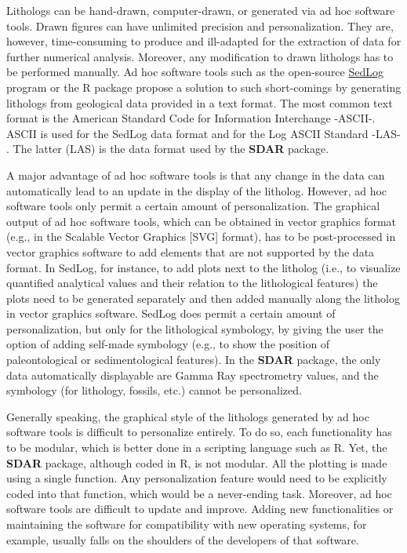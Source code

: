  Lithologs can be hand-drawn, computer-drawn, or generated via ad hoc software tools. Drawn figures can have unlimited precision and personalization. They are, however, time-consuming to produce and ill-adapted for the extraction of data for further numerical analysis. Moreover, any modification to drawn lithologs has to be performed manually. Ad hoc software tools such as the open-source \href{http://www.sedlog.com/}{SedLog} program \citep{zervas_sedlog_2009} or the  R package \citep{ortiz_sdar_2019} propose a solution to such short-comings by generating lithologs from geological data provided in a text format. The most common text format is the American Standard Code for Information Interchange -ASCII-. ASCII is used for the SedLog data format and for the Log ASCII Standard -LAS- \citep{heslop_log_1999}. The latter (LAS) is the data format used by the \textbf{SDAR} package. 
 
 A major advantage of ad hoc software tools is that any change in the data can automatically lead to an update in the display of the litholog. However, ad hoc software tools only permit a certain amount of personalization. The graphical output of ad hoc software tools, which can be obtained in vector graphics format (e.g., in the Scalable Vector Graphics [SVG] format), has to be post-processed in vector graphics software to add elements that are not supported by the data format. In SedLog, for instance, to add plots next to the litholog (i.e., to visualize quantified analytical values and their relation to the lithological features) the plots need to be generated separately and then added manually along the litholog in vector graphics software. SedLog does permit a certain amount of personalization, but only for the lithological symbology, by giving the user the option of adding self-made symbology (e.g., to show the position of paleontological or sedimentological features). In the \textbf{SDAR} package, the only data automatically displayable are Gamma Ray spectrometry values, and the symbology (for lithology, fossils, etc.) cannot be personalized. 
 
Generally speaking, the graphical style of the lithologs generated by ad hoc software tools is difficult to personalize entirely. To do so, each functionality has to be modular, which is better done in a scripting language such as R. Yet, the \textbf{SDAR} package, although coded in R, is not modular. All the plotting is made using a single function. Any personalization feature would need to be explicitly coded into that function, which would be a never-ending task. Moreover, ad hoc software tools are difficult to update and improve. Adding new functionalities or maintaining the software for compatibility with new operating systems, for example, usually falls on the shoulders of the developers of that software.

